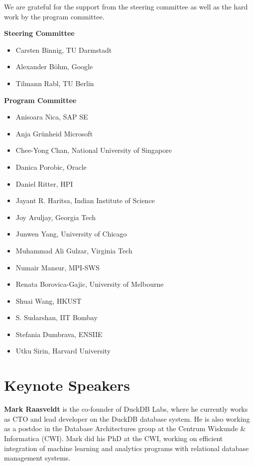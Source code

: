 \documentclass[sigconf]{acmart}
\begin{document}
We are grateful for the support from the steering committee as well as the hard work by the program committee.

\textbf{Steering Committee}
\begin{itemize}
	\item Carsten Binnig, TU Darmstadt
	\item Alexander Böhm, Google
	\item Tilmann Rabl, TU Berlin
\end{itemize}

\noindent{}\textbf{Program Committee}
\begin{itemize}
	\item Anisoara Nica, SAP SE
	\item Anja Grünheid Microsoft
	\item Chee-Yong Chan, National University of Singapore
	\item Danica Porobic, Oracle
	\item Daniel Ritter, HPI
	\item Jayant R. Haritsa, Indian Institute of Science
	\item Joy Aruljay, Georgia Tech
	\item Junwen Yang, University of Chicago
	\item Muhammad Ali Gulzar, Virginia Tech
	\item Numair Mansur, MPI-SWS
	\item Renata Borovica-Gajic, University of Melbourne
	\item Shuai Wang, HKUST
	\item S. Sudarshan, IIT Bombay
	\item Stefania Dumbrava, ENSIIE
	\item Utku Sirin, Harvard University
\end{itemize}

\section{Keynote Speakers}
\textbf{Mark Raasveldt} is the co-founder of DuckDB Labs, where he currently works as CTO and lead developer on the DuckDB database system. He is also working as a postdoc in the Database Architectures group at the Centrum Wiskunde \& Informatica (CWI). Mark did his PhD at the CWI, working on efficient integration of machine learning and analytics programs with relational database management systems. 
\end{document}
